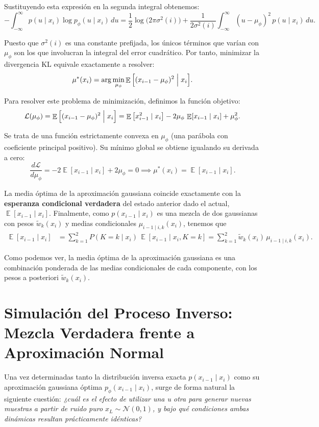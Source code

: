 \documentclass[11pt,a4paper]{article}
\DeclareMathOperator{\E}{\mathbb{E}}
\begin{document}
Sustituyendo esta expresión en la segunda integral obtenemos:
\[
-\int_{-\infty}^\infty p(u \mid x_i) \log p_\phi(u \mid x_i) \, du = \frac{1}{2}\log\big(2\pi\sigma^2(i)\big) + \frac{1}{2\sigma^2(i)} \int_{-\infty}^\infty (u - \mu_\phi)^2 \, p(u \mid x_i) \, du.
\]

Puesto que $\sigma^2(i)$ es una constante prefijada, los únicos términos que varían con $\mu_\phi$ son los que involucran la integral del error cuadrático. Por tanto, minimizar la divergencia KL equivale exactamente a resolver:
\[
\mu^*(x_i) = \arg\min_{\mu_\phi} \E\Big[(x_{i-1} - \mu_\phi)^2 \Bigm| x_i\Big].
\]

Para resolver este problema de minimización, definimos la función objetivo:
\[
\mathcal{L}(\mu_\phi) = \E\Big[(x_{i-1} - \mu_\phi)^2 \Bigm| x_i\Big] = \E\big[x_{i-1}^2 \mid x_i\big] - 2\mu_\phi\,\E[x_{i-1} \mid x_i] + \mu_\phi^2.
\]

Se trata de una función estrictamente convexa en $\mu_\phi$ (una parábola con coeficiente principal positivo). Su mínimo global se obtiene igualando su derivada a cero:
\[
\frac{d\mathcal{L}}{d\mu_\phi} = -2\E[x_{i-1} \mid x_i] + 2\mu_\phi = 0 \implies \mu^*(x_i) = \E[x_{i-1} \mid x_i].
\]

La media óptima de la aproximación gaussiana coincide exactamente con la \textbf{esperanza condicional verdadera} del estado anterior dado el actual, $\E[x_{i-1} \mid x_i]$.
Finalmente, como $p(x_{i-1} \mid x_i)$ es una mezcla de dos gaussianas con pesos $\tilde{w}_k(x_i)$ y medias condicionales $\mu_{i-1\mid i, k}(x_i)$, tenemos que
\begin{align*}
    \E[x_{i-1} \mid x_i] &= \sum_{k=1}^2 P(K = k \mid x_i) \, \E[x_{i-1} \mid x_i, K = k] = \sum_{k=1}^2 \tilde{w}_k(x_i) \, \mu_{i-1\mid i, k}(x_i).
\end{align*}

Como podemos ver, la media óptima de la aproximación gaussiana es una combinación ponderada de las medias condicionales de cada componente, con los pesos a posteriori $\tilde{w}_k(x_i)$.


\section{Simulación del Proceso Inverso: Mezcla Verdadera frente a Aproximación Normal}

Una vez determinadas tanto la distribución inversa exacta $p(x_{i-1} \mid x_i)$ como su aproximación gaussiana óptima $p_\phi(x_{i-1} \mid x_i)$, surge de forma natural la siguiente cuestión: \textit{¿cuál es el efecto de utilizar una u otra para generar nuevas muestras a partir de ruido puro $x_L \sim \mathcal{N}(0, 1)$, y bajo qué condiciones ambas dinámicas resultan prácticamente idénticas?}
\end{document}
